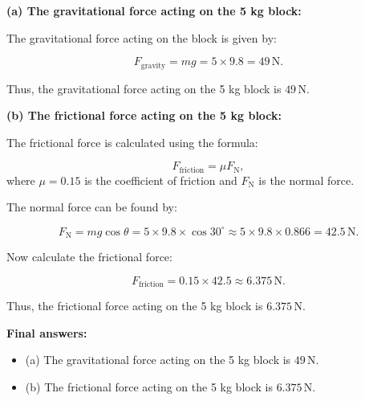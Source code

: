 \documentclass[addpoints]{exam}
\begin{document}
\begin{questions}
\begin{solution}[5cm]
\textbf{(a) The gravitational force acting on the 5 kg block:}

The gravitational force acting on the block is given by:

\[
F_{\text{gravity}} = m g = 5 \times 9.8 = 49 \, \text{N}.
\]

Thus, the gravitational force acting on the 5 kg block is \( 49 \, \text{N} \).

\textbf{(b) The frictional force acting on the 5 kg block:}

The frictional force is calculated using the formula:

\[
F_{\text{friction}} = \mu F_{\text{N}},
\]
where \( \mu = 0.15 \) is the coefficient of friction and \( F_{\text{N}} \) is the normal force.

The normal force can be found by:

\[
F_{\text{N}} = m g \cos \theta = 5 \times 9.8 \times \cos 30^\circ \approx 5 \times 9.8 \times 0.866 = 42.5 \, \text{N}.
\]

Now calculate the frictional force:

\[
F_{\text{friction}} = 0.15 \times 42.5 \approx 6.375 \, \text{N}.
\]

Thus, the frictional force acting on the 5 kg block is \( 6.375 \, \text{N} \).

\textbf{Final answers:}
\begin{itemize}
    \item (a) The gravitational force acting on the 5 kg block is \( 49 \, \text{N} \).
    \item (b) The frictional force acting on the 5 kg block is \( 6.375 \, \text{N} \).
\end{itemize}
\end{solution}




\end{questions}
\end{document}
